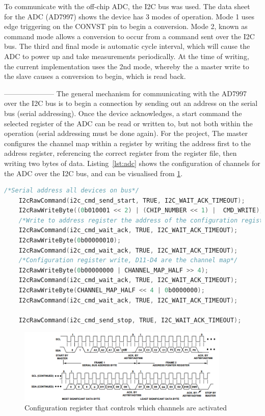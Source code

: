 \documentclass[]{article}
\begin{document}
To communicate with the off-chip \ac{ADC}, the I2C bus was used. The data sheet for the \ac{ADC} (AD7997) \cite{ad7997} shows the device has 3 modes of operation. Mode 1 uses edge triggering on the CONVST pin to begin a conversion. Mode 2, known as command mode allows a conversion to occur from a command sent over the I2C bus. The third and final mode is automatic cycle interval, which will cause the \ac{ADC} to power up and take measurements periodically. At the time of writing, the current implementation uses the 2nd mode, whereby the a master write to the slave causes a conversion to begin, which is read back. 


---------------------
The general mechanism for communicating with the \ac{AD7997} over the I2C bus is to begin a connection by sending out an address on the serial bus (serial addressing). Once the device acknowledges, a start command the selected register of the \ac{ADC} can be read or written to, but not both within the operation (serial addressing must be done again). For the project, The master configures the channel map within a register by writing the address first to the address register, referencing the correct register from the register file, then writing two bytes of data. Listing~\ref{lst:adc} shows the configuration of channels for the \ac{ADC} over the I2C bus, and can be visualised from \ref{fig:waveform}.


\begin{lstlisting}[language=C, caption=ADC I2C bus channel map configuration,label={lst:adc}]
    /*Serial address all devices on bus*/
    I2cRawCommand(i2c_cmd_send_start, TRUE, I2C_WAIT_ACK_TIMEOUT);
    I2cRawWriteByte((0b010001 << 2) | (CHIP_NUMBER << 1) |  CMD_WRITE);
    /*Write to address register the address of the configuration register */
    I2cRawCommand(i2c_cmd_wait_ack, TRUE, I2C_WAIT_ACK_TIMEOUT);
    I2cRawWriteByte(0b00000010);
    I2cRawCommand(i2c_cmd_wait_ack, TRUE, I2C_WAIT_ACK_TIMEOUT);  
    /*Configuration register write, D11-D4 are the channel map*/
    I2cRawWriteByte(0b00000000 | CHANNEL_MAP_HALF >> 4);
    I2cRawCommand(i2c_cmd_wait_ack, TRUE, I2C_WAIT_ACK_TIMEOUT);  
    I2cRawWriteByte(CHANNEL_MAP_HALF << 4 | 0b0000000);
    I2cRawCommand(i2c_cmd_wait_ack, TRUE, I2C_WAIT_ACK_TIMEOUT);  
    
    I2cRawCommand(i2c_cmd_send_stop, TRUE, I2C_WAIT_ACK_TIMEOUT);
\end{lstlisting}


\begin{figure}[H]
	\begin{center}
		\includegraphics[width = 0.9\textwidth]{waveform}
	\end{center}
	\caption{Configuration register that controls which channels are activated}
	\label{fig:waveform}
\end{figure}
\end{document}
